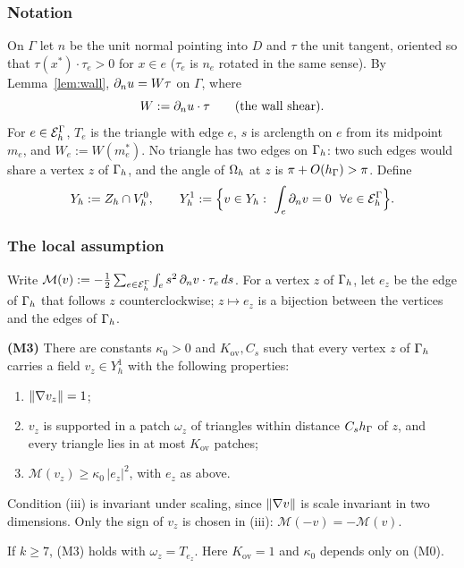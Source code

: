 \subsubsection{Notation}
On $\Gamma$ let $n$ be the unit normal pointing into $D$ and $\tau$ the unit tangent, oriented so that $\tau(x^\ast)\cdot\tau_e>0$ for $x\in e$ ($\tau_e$ is $n_e$ rotated in the same sense). By Lemma~\ref{lem:wall}, $\partial_n u=W\tau$ on $\Gamma$, where
\[
W:=\partial_n u\cdot\tau\qquad\text{(the wall shear)}.
\]
For $e\in\mathcal E_h^\Gamma$, $T_e$ is the triangle with edge $e$, $s$ is arclength on $e$ from its midpoint $m_e$, and $W_e:=W(m_e^\ast)$. No triangle has two edges on $\Gamma_h$: two such edges would share a vertex $z$ of $\Gamma_h$, and the angle of $\Omega_h$ at $z$ is $\pi+O(h_\Gamma)>\pi$. Define
\[
Y_h:=\Zh\cap\VO,\qquad Y_h^1:=\Bigl\{v\in Y_h:\ \int_e\dn v=0\ \ \forall e\in\EG\Bigr\}.
\]

\subsubsection{The local assumption}
Write $\mathcal M(v):=-\tfrac12\sum_{e\in\mathcal E_h^\Gamma}\int_e s^2\,\partial_n v\cdot\tau_e\,ds$. For a vertex $z$ of $\Gamma_h$, let $e_z$ be the edge of $\Gamma_h$ that follows $z$ counterclockwise; $z\mapsto e_z$ is a bijection between the vertices and the edges of $\Gamma_h$.

\begin{assumption}\label{lb:ass}
\textbf{(M3)} There are constants $\kappa_0>0$ and $K_{\mathrm{ov}},C_s$ such that every vertex $z$ of $\Gamma_h$ carries a field $v_z\in Y_h^1$ with the following properties:
\begin{enumerate}[label=(\roman*)]
\item $\lVert \nabla v_z\rVert=1$;
\item $v_z$ is supported in a patch $\omega_z$ of triangles within distance $C_sh_\Gamma$ of $z$, and every triangle lies in at most $K_{\mathrm{ov}}$ patches;
\item $\mathcal M(v_z)\ge\kappa_0\,|e_z|^2$, with $e_z$ as above.
\end{enumerate}
\end{assumption}

Condition (iii) is invariant under scaling, since $\lVert \nabla v\rVert$ is scale invariant in two dimensions. Only the sign of $v_z$ is chosen in (iii): $\mathcal M(-v)=-\mathcal M(v)$.

\begin{lemma}[(M3) for $k\ge7$]\label{lb:k7}
If $k\ge7$, (M3) holds with $\omega_z=T_{e_z}$. Here $K_{\mathrm{ov}}=1$ and $\kappa_0$ depends only on (M0).
\end{lemma}

